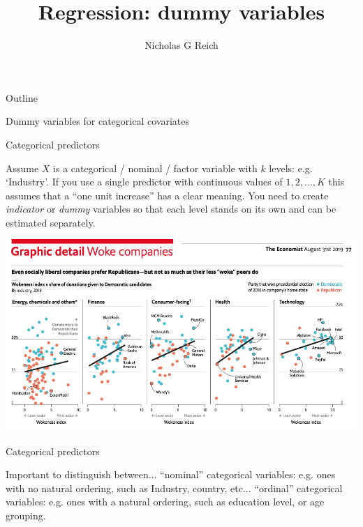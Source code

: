 \documentclass[table]{beamer}\usepackage[]{graphicx}\usepackage[]{color}
\title{Regression: dummy variables}
\author{Nicholas G Reich}
\begin{document}
\begin{frame}[plain]
	\titlepage
\end{frame}







\begin{frame}{Outline}



\bi
  \myitem Dummy variables for categorical covariates
\ei
	
\end{frame}






\begin{frame}{Categorical predictors}

\bi
	\myitem Assume $X$ is a categorical / nominal / factor variable with $k$ levels: e.g. `Industry'.
	\myitem If you use a single predictor with continuous values of $1, 2, \ldots, K$ this assumes that a ``one unit increase'' has a clear meaning.
	\myitem You need to create {\it indicator} or {\it dummy} variables so that each level stands on its own and can be estimated separately.
\ei

\centering
\includegraphics[width=.7\textwidth]{figure-static/woke-factors.png}

\end{frame}


\begin{frame}{Categorical predictors}

\begin{block}{Important to distinguish between...}
\bi
	\myitem  ``nominal'' categorical variables: e.g. ones with no natural ordering, such as Industry, country, etc...
	\myitem ``ordinal'' categorical variables: e.g. ones with a natural ordering, such as education level, or age grouping.
\ei
\end{block}

\end{frame}
\end{document}
